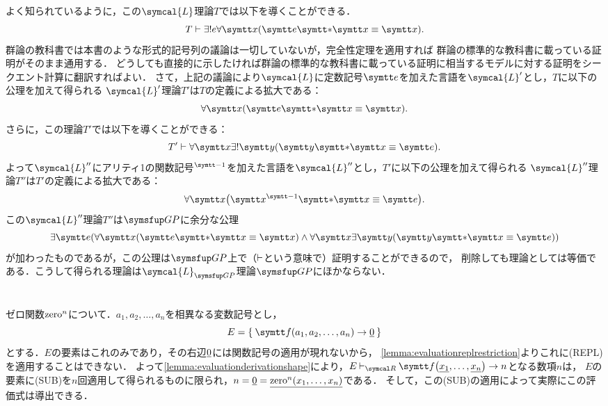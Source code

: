 \subsection*{}

よく知られているように，この\(\symcal{L}\)理論\(T\)では以下を導くことができる．
\[
	T \provable \uexists e \forall \obj{x} \paren{\obj{e} \obj{\ast} \obj{x} \objeq \obj{x}}.
\]
群論の教科書では本書のような形式的記号列の議論は一切していないが，完全性定理を適用すれば
群論の標準的な教科書に載っている証明がそのまま通用する．
どうしても直接的に示したければ群論の標準的な教科書に載っている証明に相当するモデルに対する証明をシークエント計算に翻訳すればよい．
さて，上記の議論により\(\symcal{L}\)に定数記号\(\obj{e}\)を加えた言語を\(\symcal{L}'\)とし，\(T\)に以下の公理を加えて得られる
\(\symcal{L}'\)理論\(T'\)は\(T\)の定義による拡大である：
\[
	\forall \obj{x} \paren{\obj{e} \obj{\ast} \obj{x} \objeq \obj{x}}.
\]
さらに，この理論\(T'\)では以下を導くことができる：
\[
	T' \provable \forall \obj{x} \uexists \obj{y} \paren{\obj{y} \obj{\ast} \obj{x} \objeq \obj{e}}.
\]
よって\(\symcal{L}''\)にアリティ1の関数記号\({}^{\obj{-1}}\)を加えた言語を\(\symcal{L}''\)とし，\(T'\)に以下の公理を加えて得られる
\(\symcal{L}''\)理論\(T''\)は\(T'\)の定義による拡大である：
\[
	\forall \obj{x} \paren{\obj{x}^{\obj{-1}} \obj{\ast} \obj{x} \objeq \obj{e}}.
\]
この\(\symcal{L}''\)理論\(T''\)は\(\GP\)に余分な公理
\[
	\exists \obj{e} \paren{\forall \obj{x} \paren{\obj{e} \obj{\ast} \obj{x} \objeq \obj{x}} \land \forall \obj{x} \exists \obj{y} \paren{\obj{y} \obj{\ast} \obj{x} \objeq \obj{e}}}
\]
が加わったものであるが，この公理は\(\GP\)上で（\(\vdash\)という意味で）証明することができるので，
削除しても理論としては等価である．こうして得られる理論は\(\symcal{L}_{\GP}\)理論\(\GP\)にほかならない．

\section*{}

\subsection*{}

ゼロ関数\(\operatorname{zero}^n\)について．\(a_1, a_2, \dots, a_n\)を相異なる変数記号とし，
\[
	E = \Set{\apply{\obj{f}}{a_1, a_2, \dots, a_n} \evaluate \numeral{0}}
\]
とする．\(E\)の要素はこれのみであり，その右辺\(\underline{0}\)には関数記号の適用が現れないから，
\cref{lemma:evaluationreplrestriction}よりこれに(REPL)を適用することはできない．
よって\cref{lemma:evaluationderivationshape}により，\(E \evaluatable \apply{\obj{f}}{\numeral{x_1}, \dots, \numeral{x_n}} \evaluate n\)となる数項\(n\)は，
\(E\)の要素に(SUB)を\(n\)回適用して得られるものに限られ，\(n = \numeral{0} = \numeral{\apply{\zero^n}{x_1, \dots, x_n}}\)である．
そして，この(SUB)の適用によって実際にこの評価式は導出できる．

